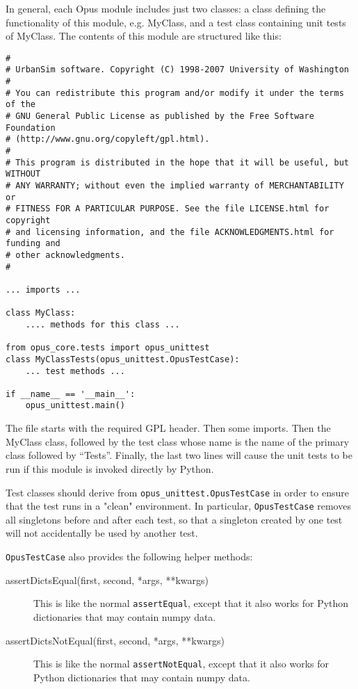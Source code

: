 In general, each Opus module includes just two classes: a class defining the
functionality of this module, e.g. MyClass, and a test class containing unit
tests of MyClass.  The contents of this module are structured like
this:

\begin{verbatim}
#
# UrbanSim software. Copyright (C) 1998-2007 University of Washington
#
# You can redistribute this program and/or modify it under the terms of the
# GNU General Public License as published by the Free Software Foundation
# (http://www.gnu.org/copyleft/gpl.html).
#
# This program is distributed in the hope that it will be useful, but WITHOUT
# ANY WARRANTY; without even the implied warranty of MERCHANTABILITY or
# FITNESS FOR A PARTICULAR PURPOSE. See the file LICENSE.html for copyright
# and licensing information, and the file ACKNOWLEDGMENTS.html for funding and
# other acknowledgments.
#

... imports ...

class MyClass:
    .... methods for this class ...

from opus_core.tests import opus_unittest
class MyClassTests(opus_unittest.OpusTestCase):
    ... test methods ...

if __name__ == '__main__':
    opus_unittest.main()
\end{verbatim}

The file starts with the required GPL header.  Then some imports.  Then the
MyClass class, followed by the test class whose name is the name of the primary
class followed by ``Tests''.  Finally, the last two lines will
cause the unit tests to be run if this module is invoked directly by Python.

Test classes should derive from \verb|opus_unittest.OpusTestCase| in order to 
ensure that the test runs in a "clean" environment.  In particular, 
\verb|OpusTestCase| removes all singletons before and after each test, so
that a singleton created by one test will not accidentally be used by another
test. 

\verb|OpusTestCase| also provides the following helper methods:

\begin{description}
  \item[assertDictsEqual(first, second, *args, **kwargs)] This is like the
  normal \verb|assertEqual|, except that it also works for Python dictionaries
  that may contain numpy data. 
  \item[assertDictsNotEqual(first, second, *args, **kwargs)] This is like the
  normal \verb|assertNotEqual|, except that it also works for Python
  dictionaries that may contain numpy data. 
\end{description}

